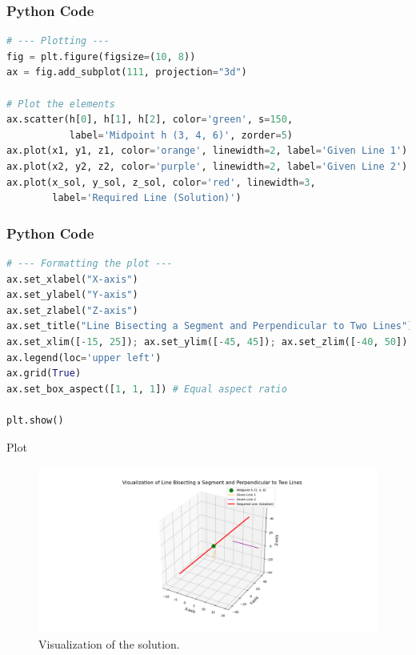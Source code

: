 \documentclass{beamer}
\begin{document}
\begin{frame}[fragile]
  \frametitle{Python Code}
  \begin{lstlisting}[language=Python]
# --- Plotting ---
fig = plt.figure(figsize=(10, 8))
ax = fig.add_subplot(111, projection="3d")

# Plot the elements
ax.scatter(h[0], h[1], h[2], color='green', s=150, 
           label='Midpoint h (3, 4, 6)', zorder=5)
ax.plot(x1, y1, z1, color='orange', linewidth=2, label='Given Line 1')
ax.plot(x2, y2, z2, color='purple', linewidth=2, label='Given Line 2')
ax.plot(x_sol, y_sol, z_sol, color='red', linewidth=3, 
        label='Required Line (Solution)')
  \end{lstlisting}
\end{frame}
\begin{frame}[fragile]
  \frametitle{Python Code}
  \begin{lstlisting}[language=Python]
# --- Formatting the plot ---
ax.set_xlabel("X-axis")
ax.set_ylabel("Y-axis")
ax.set_zlabel("Z-axis")
ax.set_title("Line Bisecting a Segment and Perpendicular to Two Lines")
ax.set_xlim([-15, 25]); ax.set_ylim([-45, 45]); ax.set_zlim([-40, 50])
ax.legend(loc='upper left')
ax.grid(True)
ax.set_box_aspect([1, 1, 1]) # Equal aspect ratio

plt.show()
  \end{lstlisting}
\end{frame}

\begin{frame}{Plot}
  \begin{figure}
    \centering
	  \includegraphics[width=\textwidth]{../figs/figure_py.png}
    \caption{Visualization of the solution.}
    \label{fig:final_plot}
  \end{figure}
\end{frame}
\end{document}
